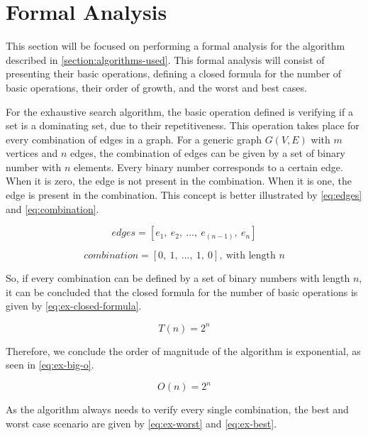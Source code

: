 \section{Formal Analysis}\label{section:formal-analysis}
This section will be focused on performing a formal analysis for the algorithm described in \autoref{section:algorithms-used}.
This formal analysis will consist of presenting their basic operations, defining a closed formula for the number of basic operations, their order of growth, and the worst and best cases.

For the exhaustive search algorithm, the basic operation defined is verifying if a set is a dominating set, due to their repetitiveness.
This operation takes place for every combination of edges in a graph.
For a generic graph $G(V,E)$ with $m$ vertices and $n$ edges, the combination of edges can be given by a set of binary number with $n$ elements.
Every binary number corresponds to a certain edge. 
When it is zero, the edge is not present in the combination.
When it is one, the edge is present in the combination.
This concept is better illustrated by \autoref{eq:edges} and \autoref{eq:combination}.

\begin{equation}
    edges = [e_1,\ e_2,\ ...,\ e_(n-1),\ e_n]
    \label{eq:edges}
\end{equation}

\begin{equation}
    combination = [0,\ 1,\ ...,\ 1,\ 0],\ \text{with length }n
    \label{eq:combination}
\end{equation}

So, if every combination can be defined by a set of binary numbers with length $n$, it can be concluded that the closed formula for the number of basic operations is given by \autoref{eq:ex-closed-formula}.

\begin{equation}
    T(n) = 2^n
    \label{eq:ex-closed-formula}
\end{equation}

Therefore, we conclude the order of magnitude of the algorithm is exponential, as seen in \autoref{eq:ex-big-o}.

\begin{equation}
    O(n) = 2^n
    \label{eq:ex-big-o}
\end{equation}

As the algorithm always needs to verify every single combination, the best and worst case scenario are given by \autoref{eq:ex-worst} and \autoref{eq:ex-best}.

